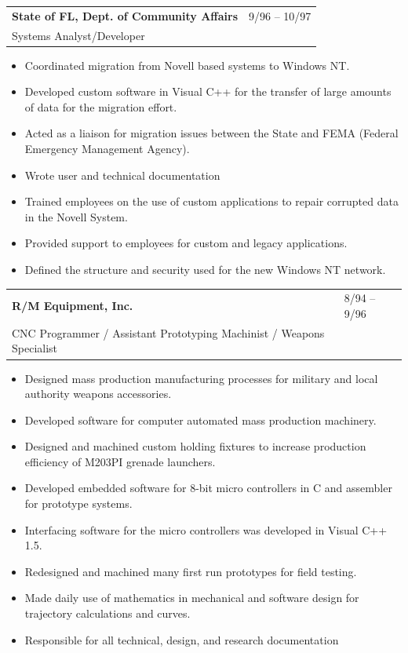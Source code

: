 \documentclass[10pt]{report}
\begin{document}
\noindent
\begin{tabular}{ L{.5\textwidth}  R{.4\textwidth} }
\textbf{\large State of FL, Dept. of Community Affairs}  & 9/96 -- 10/97 \\
Systems Analyst/Developer &
\end{tabular}

\begin{itemize}
\item Coordinated migration from Novell based systems to Windows NT.
\item Developed custom software in Visual C++ for the transfer of large amounts of data for the migration effort.
\item Acted as a liaison for migration issues between the State and FEMA (Federal Emergency Management Agency).
\item Wrote user and technical documentation
\item Trained employees on the use of custom applications to repair corrupted data in the Novell System.
\item Provided support to employees for custom and legacy applications.
\item Defined the structure and security used for the new Windows NT network.
\end{itemize}
\bigskip

\noindent
\begin{tabular}{ L{.5\textwidth}  R{.4\textwidth} }
\textbf{\large R/M Equipment, Inc.}  & 8/94 -- 9/96 \\
CNC Programmer / Assistant Prototyping Machinist / Weapons Specialist &
\end{tabular}

\begin{itemize}
\item Designed mass production manufacturing processes for military and local authority weapons accessories.
\item Developed software for computer automated mass production machinery.
\item Designed and machined custom holding fixtures to increase production efficiency of M203PI grenade launchers.
\item Developed embedded software for 8-bit micro controllers in C and assembler for prototype systems.
\item Interfacing software for the micro controllers was developed in Visual C++ 1.5.
\item Redesigned and machined many first run prototypes for field testing.
\item Made daily use of mathematics in mechanical and software design for trajectory calculations and curves.
\item Responsible for all technical, design, and research documentation  
\end{itemize}
\bigskip
\end{document}
